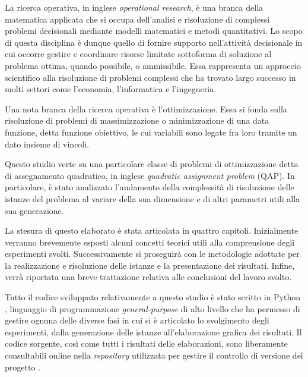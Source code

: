 La ricerca operativa, in inglese \textit{operational research}, è una branca della matematica applicata 
che si occupa dell'analisi e risoluzione di complessi problemi decisionali mediante modelli matematici e 
metodi quantitativi. Lo scopo di questa disciplina è dunque quello di fornire supporto nell'attività 
decisionale in cui occorre gestire e coordinare risorse limitate sottoforma di soluzione al problema ottima, 
quando possibile, o ammissibile. Essa rappresenta un approccio scientifico alla risoluzione di problemi 
complessi che ha trovato largo successo in molti settori come l'economia, l'informatica e l'ingegneria.

Una nota branca della ricerca operativa è l'ottimizzazione. Essa si fonda sulla risoluzione di problemi di 
massimizzazione o minimizzazione di una data funzione, detta funzione obiettivo, le cui variabili sono legate 
fra loro tramite un dato insieme di vincoli.

Questo studio verte su una particolare classe di problemi di ottimizzazione detta di assegnamento quadratico,
in inglese \textit{quadratic assignment problem} (QAP). In particolare, è stato analizzato l'andamento della
complessità di risoluzione delle istanze del problema al variare della sua dimensione e di altri parametri 
utili alla sua generazione.

La stesura di questo elaborato è stata articolata in quattro capitoli. Inizialmente verranno brevemente esposti
alcuni concetti teorici utili alla comprensione degli esperimenti svolti. Successivamente si proseguirà con le
metodologie adottate per la realizzazione e risoluzione delle istanze e la presentazione dei risultati. Infine,
verrà riportata una breve trattazione relativa alle conclusioni del lavoro svolto.

Tutto il codice sviluppato relativamente a questo studio è stato scritto in Python \cite{python}, linguaggio di 
programmazione \textit{general-purpose} di alto livello che ha permesso di gestire ognuna delle diverse fasi in 
cui si è articolato lo svolgimento degli esperimenti, dalla generazione delle istanze all'elaborazione grafica dei 
risultati. Il codice sorgente, così come tutti i risultati delle elaborazioni, sono liberamente consultabili 
online nella \textit{repository} utilizzata per gestire il controllo di versione del progetto \cite{repository}.